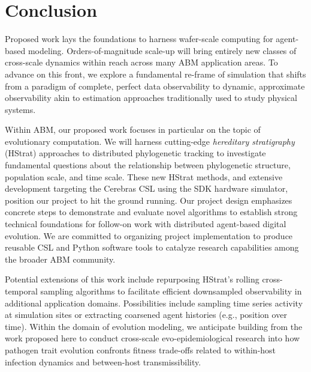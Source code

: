 \section{Conclusion} \label{sec:conclusion}

Proposed work lays the foundations to harness wafer-scale computing for agent-based modeling.
Orders-of-magnitude scale-up will bring entirely new classes of cross-scale dynamics within reach across many ABM application areas.
To advance on this front, we explore a fundamental re-frame of simulation that shifts from a paradigm of complete, perfect data observability to dynamic, approximate observability akin to estimation approaches traditionally used to study physical systems.

Within ABM, our proposed work focuses in particular on the topic of evolutionary computation.
We will harness cutting-edge \textit{hereditary stratigraphy} (HStrat) approaches to distributed phylogenetic tracking to investigate fundamental questions about the relationship between phylogenetic structure, population scale, and time scale.
These new HStrat methods, and extensive development targeting the Cerebras CSL using the SDK hardware simulator, position our project to hit the ground running.
Our project design emphasizes concrete steps to demonstrate and evaluate novel algorithms to establish strong technical foundations for follow-on work with distributed agent-based digital evolution.
We are committed to organizing project implementation to produce reusable CSL and Python software tools to catalyze research capabilities among the broader ABM community.

Potential extensions of this work include repurposing HStrat's rolling cross-temporal sampling algorithms to facilitate efficient downsampled observability in additional application domains.
Possibilities include sampling time series activity at simulation sites or extracting coarsened agent histories (e.g., position over time).
Within the domain of evolution modeling, we anticipate building from the work proposed here to conduct cross-scale evo-epidemiological research into how pathogen trait evolution confronts fitness trade-offs related to within-host infection dynamics and between-host transmissibility.
